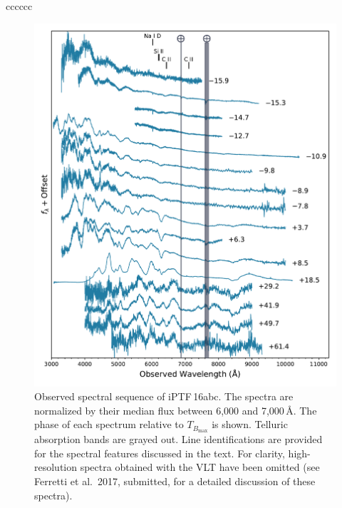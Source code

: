 \documentclass[twocolumn]{aastex61}
\newcommand{\abc}{iPTF\,16abc}
\begin{document}
\begin{deluxetable}{cccccc}
  \enddata
\end{deluxetable}

\begin{figure}[!htb]
  \centering
  \includegraphics[width=1.0\textwidth]{spectra.pdf}
  \caption{Observed spectral sequence of \abc. The spectra are 
  normalized by their median flux between 6,000 and 
  7,000$\,\textrm{\AA}$.  The phase of each spectrum 
  relative to $T_{B_\mathrm{max}}$ is shown. Telluric absorption
  bands are grayed out. Line identifications are provided for 
  the spectral features discussed in the text. 
  For clarity, high-resolution spectra obtained with the VLT have been omitted (see Ferretti et al.\ 2017, submitted, for a detailed discussion of these spectra).}
  \label{fig:spec_seq}
\end{figure}
\end{document}
